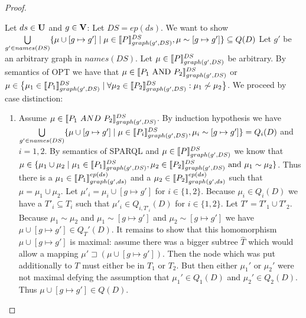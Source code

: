 \begin{proof}
\begin{enumerate}
			\bigskip\noindent
			Let $ds\in \mathbf{U}$ and $g \in \mathbf{V}$: Let $DS = ep(ds)$.
			We want to show 
			$\bigcup\limits_{g' \in names(DS)}\{ \mu \cup [g \mapsto g'] \mid \mu \in
				\llbracket P\rrbracket^{DS}_{graph(g',DS)} , \mu \sim
			[g\mapsto g'] \} \subseteq Q(D) $
			Let $g'$ be an arbitrary graph in $names(DS)$. Let $\mu \in \llbracket P
			\rrbracket^{DS}_{graph(g',DS)}$ be arbitrary.
			By semantics of OPT we have that $\mu \in \llbracket P_1 \mbox{ AND }  P_2
			\rrbracket^{DS}_{graph(g',DS)}$ or 
			$\mu \in \big\{ \mu_1 \in  \llbracket P_1 \rrbracket^{DS}_{graph(g',DS)} \mid \forall \mu_2 \in \llbracket P_2
				\rrbracket^{DS}_{graph(g',DS)}:
			\mu_1 \not\sim \mu_2 \big\}$. 
			We proceed by case distinction:
			\begin{enumerate}
				\item Assume $\mu \in \llbracket P_1 \ AND \ P_2 \rrbracket^{DS}_{graph(g',DS)}$. 
					By induction hypothesis we have 
					$\bigcup\limits_{g' \in names(DS)} \{ \mu \cup [g \mapsto g'] \mid \mu \in
						\llbracket P_i\rrbracket^{DS}_{graph(g',DS)}, \mu_i \sim
					[g\mapsto g'] \}  = Q_i(D) $ and $i = 1,2$.
					By semantics of SPARQL and $\mu \in \llbracket P
					\rrbracket^{DS}_{graph(g',DS)}$ we
					know that $\mu \in \{\mu_1 \cup \mu_2 \mid \mu_1 \in \llbracket P_1
						\rrbracket^{DS}_{graph(g',DS)}, \mu_2 \in \llbracket P_2
						\rrbracket^{DS}_{graph(g',DS)}
					\mbox{ and } \mu_1 \sim \mu_2 \}$.
					Thus there is a $\mu_1 \in \llbracket P_1
					\rrbracket^{ep(ds)}_{graph(g',ds)}$ and a $\mu_2 \in \llbracket P_2
					\rrbracket^{ep(ds)}_{graph(g',ds)}$ such that $\mu = \mu_1 \cup \mu_2$.
					Let $\mu'_i = \mu_i \cup [g \mapsto g']$ for $i \in
					\{1,2\}$.  Because $\mu_i \in Q_i(D)$  we have a
					$T'_i \subseteq T_i$ such that $\mu'_i \in Q_{i,T'_i}(D)$ for $i\in \{1,2\}$.
					Let $T' = T'_1 \cup T'_2$.
					Because $\mu_1 \sim \mu_2$ and $\mu_1 \sim [g \mapsto g']$ 
					and $\mu_2 \sim [g \mapsto g']$ we have $\mu \cup [g
					\mapsto g'] \in Q_T'(D)$.
					It remains to show that this homomorphism $\mu\cup [g
					\mapsto g']$ is maximal: 
					assume there was a bigger subtree $\hat{T}$ which would allow a mapping 
					$\mu' \sqsupset (\mu\cup [g \mapsto g'])$. Then the
					node which was put additionally to $T$ must either be in $T_1$ or $T_2$.
					But then either $\mu_1'$ or $\mu_2'$ were not maximal defying the assumption
					that $\mu_1' \in Q_1(D)$ and $\mu_2' \in Q_2(D)$.
					Thus $\mu \cup [g \mapsto g']\in Q(D)$. 


\end{enumerate}
\end{enumerate}
\end{proof}
